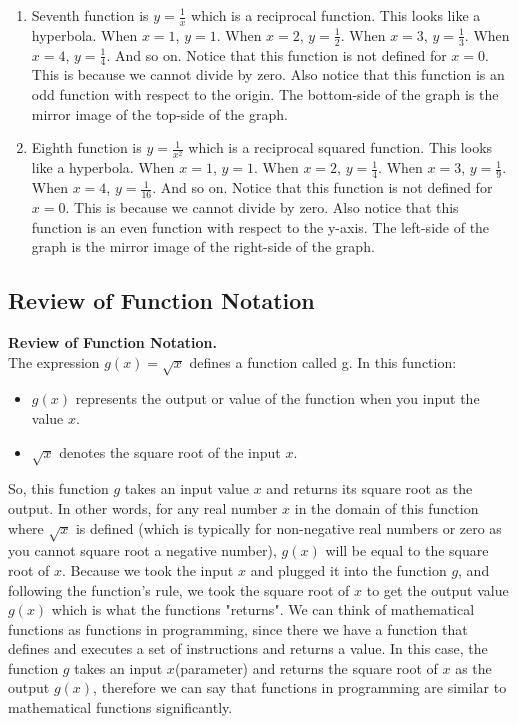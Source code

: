 \begin{enumerate}
	\item Seventh function is $y=\frac{1}{x}$ which is a reciprocal function. This looks like a hyperbola. When $x=1$, $y=1$. When $x=2$, $y=\frac{1}{2}$. When $x=3$, $y=\frac{1}{3}$. When $x=4$, $y=\frac{1}{4}$. And so on. Notice that this function is not defined for $x=0$. This is because we cannot divide by zero. Also notice that this function is an odd function with respect to the origin. The bottom-side of the graph is the mirror image of the top-side of the graph. 
	\item  Eighth function is $y=\frac{1}{x^2}$ which is a reciprocal squared function. This looks like a hyperbola. When $x=1$, $y=1$. When $x=2$, $y=\frac{1}{4}$. When $x=3$, $y=\frac{1}{9}$. When $x=4$, $y=\frac{1}{16}$. And so on. Notice that this function is not defined for $x=0$. This is because we cannot divide by zero. Also notice that this function is an even function with respect to the y-axis. The left-side of the graph is the mirror image of the right-side of the graph. 
\end{enumerate}

\subsection{Review of Function Notation}
\textbf{Review of Function Notation.} \\
The expression $g(x) = \sqrt{x}$ defines a function called g. In this function:

\begin{itemize}
	\item $g(x)$ represents the output or value of the function when you input the value $x$.
	\item $\sqrt{x}$ denotes the square root of the input $x$.
\end{itemize}
So, this function $g$ takes an input value $x$ and returns its square root as the output. In other words, for any real number $x$ in the domain of this function where $\sqrt{x}$ is defined (which is typically for non-negative real numbers or zero as you cannot square root a negative number), $g(x)$ will be equal to the square root of $x$. Because we took the input $x$ and plugged it into the function $g$, and following the function's rule, we took the square root of $x$ to get the output value $g(x)$ which is what the functions "returns". We can think of mathematical functions as functions in programming, since there we have a function that defines and executes a set of instructions and returns a value. In this case, the function $g$ takes an input $x$(parameter) and returns the square root of $x$ as the output $g(x)$, therefore we can say that functions in programming are similar to mathematical functions significantly. \\

